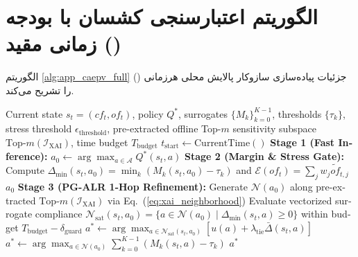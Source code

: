 \documentclass[oneside,openany,phd]{TMU-Thesis}
\begin{document}
\section{الگوریتم اعتبارسنجی کشسان با بودجه زمانی مقید (\texorpdfstring{\caepv}{CA-EPV})}
\label{sec:app_algo_caepv}

الگوریتم \ref{alg:app_caepv_full} جزئیات پیاده‌سازی سازوکار پالایش محلی هرزمانی (\pgalr) را تشریح می‌کند.

\begin{algorithm}[htbp]
\caption{الگوریتم اعتبارسنجی کشسان مرحله برنامه‌ریزی با بودجه زمانی مقید (\caepv / \pgalr)}
\label{alg:app_caepv_full}
\begin{latin}
\small
\begin{algorithmic}[1]
\REQUIRE Current state $s_t = (cf_t, of_t)$, policy $Q^*$, surrogates $\{M_k\}_{k=0}^{K-1}$, thresholds $\{\tau_k\}$, stress threshold $\epsilon_{\text{threshold}}$, pre-extracted offline Top-$m$ sensitivity subspace $\text{Top-}m(\mathcal{I}_{\text{XAI}})$, time budget $T_{\text{budget}}$
\STATE $t_{\text{start}} \leftarrow \text{CurrentTime}()$
\STATE \textbf{Stage 1 (Fast Inference):} $a_0 \leftarrow \arg\max_{a \in \mathcal{A}} Q^*(s_t, a)$ 
\STATE \textbf{Stage 2 (Margin \& Stress Gate):} Compute $\Delta_{\min}(s_t, a_0) = \min_k (M_k(s_t, a_0) - \tau_k)$ and $\mathcal{E}(of_t) = \sum_j w_j \widetilde{of}_{t,j}$
    \RETURN $a_0$ 
\ENDIF
\STATE \textbf{Stage 3 (PG-ALR 1-Hop Refinement):} Generate $\mathcal{N}(a_0)$ along pre-extracted $\text{Top-}m(\mathcal{I}_{\text{XAI}})$ via Eq.~(\ref{eq:xai_neighborhood}) 
\STATE Evaluate vectorized surrogate compliance $\mathcal{N}_{\text{sat}}(s_t, a_0) = \{ a \in \mathcal{N}(a_0) \mid \Delta_{\min}(s_t, a) \ge 0 \}$ within budget $T_{\text{budget}} - \delta_{\text{guard}}$
    \STATE $a^* \leftarrow \arg\max_{a \in \mathcal{N}_{\text{sat}}(s_t, a_0)} \left[ u(a) + \lambda_{\text{tie}} \bar{\Delta}(s_t, a) \right]$ 
\ELSE
    \STATE $a^* \leftarrow \arg\max_{a \in \mathcal{N}(a_0)} \sum_{k=0}^{K-1} (M_k(s_t, a) - \tau_k)$ 
\ENDIF
\RETURN $a^*$ 
\end{algorithmic}
\end{latin}
\end{algorithm}
\end{document}
